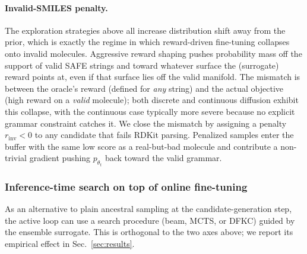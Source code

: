 \documentclass{article}
\begin{document}
\paragraph{Invalid-SMILES penalty.} The exploration strategies above all increase distribution shift away from the prior, which is exactly the regime in which reward-driven fine-tuning collapses onto invalid molecules. Aggressive reward shaping pushes probability mass off the support of valid SAFE strings and toward whatever surface the (surrogate) reward points at, even if that surface lies off the valid manifold. The mismatch is between the oracle's reward (defined for \emph{any} string) and the actual objective (high reward on a \emph{valid} molecule); both discrete \citep{wangFineTuningDiscreteDiffusion2024} and continuous diffusion \citep{ueharaELEGANT2024} exhibit this collapse, with the continuous case typically more severe because no explicit grammar constraint catches it. We close the mismatch by assigning a penalty $r_{\text{inv}} < 0$ to any candidate that fails RDKit parsing. Penalized samples enter the buffer with the same low score as a real-but-bad molecule and contribute a non-trivial gradient pushing $p_{\theta_t}$ back toward the valid grammar.


\subsubsection{Inference-time search on top of online fine-tuning}

As an alternative to plain ancestral sampling at the candidate-generation step, the active loop can use a search procedure (beam, MCTS, or DFKC) guided by the ensemble surrogate. This is orthogonal to the two axes above; we report its empirical effect in Sec.~\ref{sec:results}.
\end{document}
